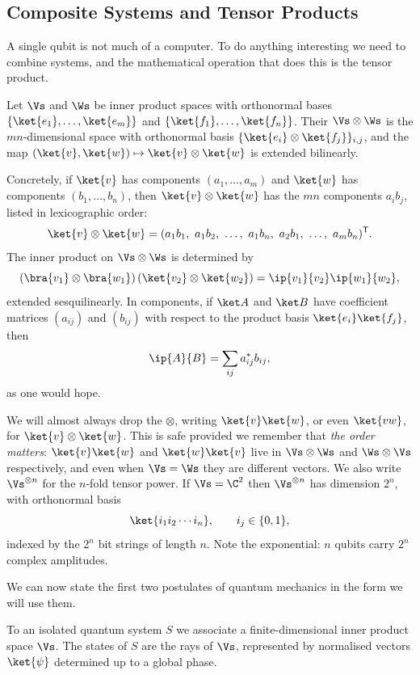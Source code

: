 \subsection{Composite Systems and Tensor Products}

A single qubit is not much of a computer. To do anything interesting we need to combine systems, and the mathematical operation that does this is the tensor product.

\begin{definition}
	Let $\Vs$ and $\Ws$ be inner product spaces with orthonormal bases $\{\ket{e_1},\dots,\ket{e_m}\}$ and $\{\ket{f_1},\dots,\ket{f_n}\}$. Their  $\Vs \otimes \Ws$ is the $mn$-dimensional space with orthonormal basis $\{\ket{e_i}\otimes\ket{f_j}\}_{i,j}$, and the map $(\ket{v},\ket{w}) \mapsto \ket{v}\otimes\ket{w}$ is extended bilinearly.
\end{definition}

Concretely, if $\ket{v}$ has components $(a_1,\dots,a_m)$ and $\ket{w}$ has components $(b_1,\dots,b_n)$, then $\ket{v}\otimes\ket{w}$ has the $mn$ components $a_i b_j$, listed in lexicographic order:
$$\ket{v} \otimes \ket{w} = (a_1b_1,\ a_1b_2,\ \dots,\ a_1 b_n,\ a_2b_1,\ \dots,\ a_mb_n)^{\mathsf T}.$$
The inner product on $\Vs \otimes \Ws$ is determined by
$$\left(\bra{v_1}\otimes\bra{w_1}\right)\left(\ket{v_2}\otimes\ket{w_2}\right) = \ip{v_1}{v_2}\ip{w_1}{w_2},$$
extended sesquilinearly. In components, if $\ket A$ and $\ket B$ have coefficient matrices $(a_{ij})$ and $(b_{ij})$ with respect to the product basis $\ket{e_i}\ket{f_j}$, then
$$\ip{A}{B} = \sum_{ij}a_{ij}^*b_{ij},$$
as one would hope.

We will almost always drop the $\otimes$, writing $\ket{v}\ket{w}$, or even $\ket{vw}$, for $\ket{v}\otimes\ket{w}$. This is safe provided we remember that \emph{the order matters}: $\ket{v}\ket{w}$ and $\ket{w}\ket{v}$ live in $\Vs\otimes\Ws$ and $\Ws\otimes\Vs$ respectively, and even when $\Vs = \Ws$ they are different vectors. We also write $\Vs^{\otimes n}$ for the $n$-fold tensor power. If $\Vs = \C^2$ then $\Vs^{\otimes n}$ has dimension $2^n$, with orthonormal basis
$$\ket{i_1 i_2 \cdots i_n}, \qquad i_j \in \{0,1\},$$
indexed by the $2^n$ bit strings of length $n$. Note the exponential: $n$ qubits carry $2^n$ complex amplitudes.

We can now state the first two postulates of quantum mechanics in the form we will use them.

\begin{axiom}[States]
	To an isolated quantum system $S$ we associate a finite-dimensional inner product space $\Vs$. The states of $S$ are the rays of $\Vs$, represented by normalised vectors $\ket{\psi}$ determined up to a global phase.
\end{axiom}

